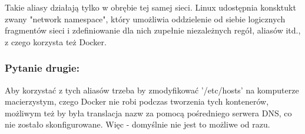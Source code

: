 \documentclass[12pt]{article}
\begin{document}
    Takie aliasy działają tylko w obrębie tej samej sieci. Linux udostępnia konsktukt zwany "network namespace", który umożliwia oddzielenie od siebie logicznych fragmentów sieci i zdefiniowanie dla nich zupełnie niezależnych regół, aliasów itd., z czego korzysta też Docker.

    \subsubsection{Pytanie drugie:}

    Aby korzystać z tych aliasów trzeba by zmodyfikować '/etc/hosts' na komputerze macierzystym, czego Docker nie robi podczas tworzenia tych kontenerów, możliwym też by była translacja nazw za pomocą pośredniego serwera DNS, co nie zostało skonfigurowane. Więc - domyślnie nie jest to możliwe od razu.
\end{document}
